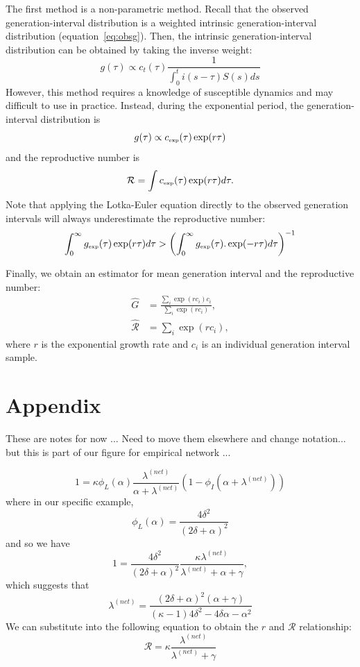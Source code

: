 \documentclass[12pt]{article}
\newcommand{\RR}{\ensuremath{{\mathcal R}}}
\newcommand{\tsub}[2]{#1_{{\textrm{\tiny #2}}}}
\begin{document}
The first method is a non-parametric method.
Recall that the observed generation-interval distribution is a weighted intrinsic generation-interval distribution (equation~\ref{eq:obsg}). 
Then, the intrinsic generation-interval distribution can be obtained by taking the inverse weight:
\begin{equation}
g(\tau) \propto c_t(\tau) \frac{1}{\int_{0}^t i(s-\tau) S(s) ds}
\end{equation}
However, this method requires a knowledge of susceptible dynamics and may difficult to use in practice.
Instead, during the exponential period, the generation-interval distribution is
\begin{equation}
g(\tau) \propto \tsub{c}{exp}(\tau) \exp(r\tau)
\end{equation}
and the reproductive number is
\begin{equation}
\RR = \int \tsub{c}{exp}(\tau) \exp(r\tau) d\tau.
\end{equation}
Note that applying the Lotka-Euler equation directly to the observed generation intervals will always underestimate the reproductive number:
\begin{equation}
\int_0^\infty \tsub{g}{exp}(\tau) \exp(r\tau) d\tau > \left(\int_0^\infty \tsub{g}{exp}(\tau). \exp(-r\tau) d\tau\right)^{-1}
\end{equation}

Finally, we obtain an estimator for mean generation interval and the reproductive number:
\begin{equation}
\begin{aligned}
\hat{G} &= \frac{\sum_{i} \exp(r c_i) c_i}{\sum_{i} \exp(r c_i)},\\
\hat{\RR} &= \sum_{i} \exp(r c_i),
\end{aligned}
\end{equation}
where $r$ is the exponential growth rate and $c_i$ is an individual generation interval sample.

\section{Appendix}

These are notes for now ... Need to move them elsewhere and change notation... but this is part of our figure for empirical network ...

$$
1 = \kappa \phi_L(\alpha) \frac{\lambda^{(net)}}{\alpha + \lambda^{(net)}} (1 - \phi_I(\alpha+\lambda^{(net)}))
$$
where in our specific example,
$$
\phi_L(\alpha) = \frac{4 \delta^2}{(2 \delta + \alpha)^2}
$$
and so we have
$$
1 = \frac{4 \delta^2}{(2 \delta + \alpha)^2} \frac{\kappa \lambda^{(net)}}{\lambda^{(net)} + \alpha + \gamma},
$$
which suggests that
$$
\lambda^{(net)} = \frac{(2\delta + \alpha)^2 (\alpha + \gamma)}{(\kappa - 1) 4 \delta^2 - 4 \delta \alpha - \alpha^2}
$$
We can substitute into the following equation to obtain the $r$ and $\RR$ relationship:
$$
\RR = \kappa \frac{\lambda^{(net)}}{\lambda^{(net)} + \gamma}
$$


\end{document}
